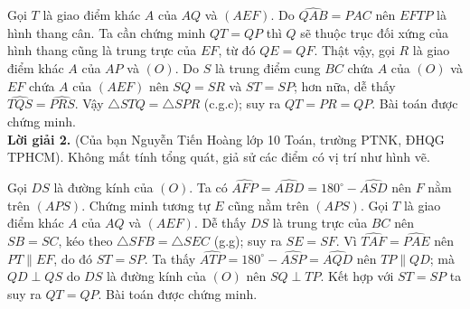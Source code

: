 \begin{bt}
{		Gọi $T$ là giao điểm khác $A$ của $AQ$ và $(AEF)$. Do $\widehat{QAB} = \widehat{PAC}$ nên $EFTP$ là hình thang cân. Ta cần chứng minh $QT = QP$ thì $Q$ sẽ thuộc trục đối xứng của hình thang cũng là trung trực của $EF$, từ đó $QE = QF$. Thật vậy, gọi $R$ là giao điểm khác $A$ của $AP$ và $(O)$. Do $S$ là trung điểm cung $BC$ chứa $A$ của $(O)$ và $EF$ chứa $A$ của $(AEF)$ nên $SQ = SR$ và $ST = SP$; hơn nữa, dễ thấy $\widehat{TQS} = \widehat{PRS}$. 
		Vậy $\triangle STQ = \triangle SPR$ (c.g.c); suy ra $QT = PR = QP$. Bài toán được chứng minh.\\
		{\bf Lời giải 2.} (Của bạn Nguyễn Tiến Hoàng lớp 10 Toán, trường PTNK, ĐHQG TPHCM).
		Không mất tính tổng quát, giả sử các điểm có vị trí như hình vẽ. 
		\begin{center}
		\end{center}
		Gọi $DS$ là đường kính của $(O)$. Ta có $\widehat{AFP} = \widehat{ABD} = 180^\circ - \widehat{ASD}$ nên $F$ nằm trên $(APS)$. Chứng minh tương tự $E$ cũng nằm trên $(APS)$. Gọi $T$ là giao điểm khác $A$ của $AQ$ và $(AEF)$. Dễ thấy $DS$ là trung trực của $BC$ nên $SB = SC$, kéo theo $\triangle SFB = \triangle SEC$ (g.g); suy ra $SE = SF$. Vì $\widehat{TAF} = \widehat{PAE}$ nên $PT \parallel EF$, do đó $ST = SP$. 
		Ta thấy $\widehat{ATP} = 180^\circ - \widehat{ASP} = \widehat{AQD}$ nên $TP \parallel QD$; mà $QD \perp QS$ do $DS$ là đường kính của $(O)$ nên $SQ \perp TP$. Kết hợp với $ST = SP$ ta suy ra $QT = QP$. Bài toán được chứng minh.
}
\end{bt}
